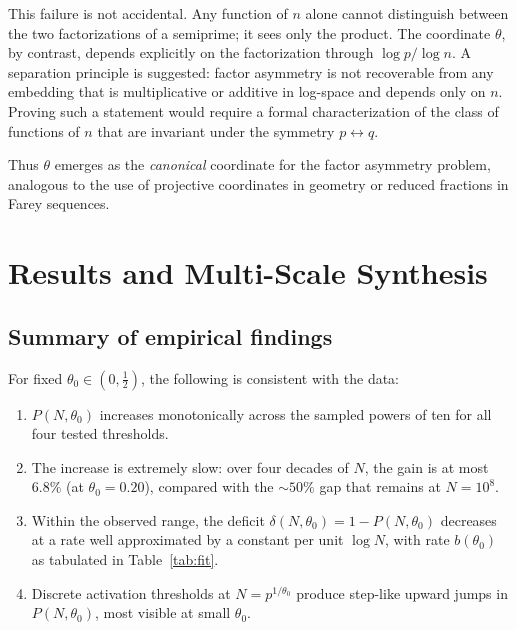 \documentclass[11pt]{article}
\theoremstyle{definition}
\begin{document}
This failure is not accidental.  Any function of \(n\) alone cannot distinguish
between the two factorizations of a semiprime; it sees only the product.  The
coordinate \(\theta\), by contrast, depends explicitly on the factorization through
\(\log p / \log n\).  A separation principle is suggested: factor asymmetry is not
recoverable from any embedding that is multiplicative or additive in log-space and
depends only on \(n\).  Proving such a statement would require a formal
characterization of the class of functions of \(n\) that are invariant under the
symmetry \(p \leftrightarrow q\).

Thus \(\theta\) emerges as the \emph{canonical} coordinate for the factor asymmetry
problem, analogous to the use of projective coordinates in geometry or reduced
fractions in Farey sequences.

\section{Results and Multi-Scale Synthesis}

\subsection{Summary of empirical findings}

For fixed \(\theta_0 \in (0, \tfrac{1}{2})\), the following is consistent with the
data:
\begin{enumerate}
  \item \(P(N,\theta_0)\) increases monotonically across the sampled powers of ten
        for all four tested thresholds.
  \item The increase is extremely slow: over four decades of \(N\), the gain is at
        most \(6.8\%\) (at \(\theta_0 = 0.20\)), compared with the \(\sim 50\%\) gap
        that remains at \(N = 10^8\).
  \item Within the observed range, the deficit
        \(\delta(N,\theta_0) = 1 - P(N,\theta_0)\) decreases at a rate well
        approximated by a constant per unit \(\log N\), with rate \(b(\theta_0)\)
        as tabulated in Table~\ref{tab:fit}.
  \item Discrete activation thresholds at \(N = p^{1/\theta_0}\) produce step-like
        upward jumps in \(P(N,\theta_0)\), most visible at small \(\theta_0\).
\end{enumerate}
\end{document}
